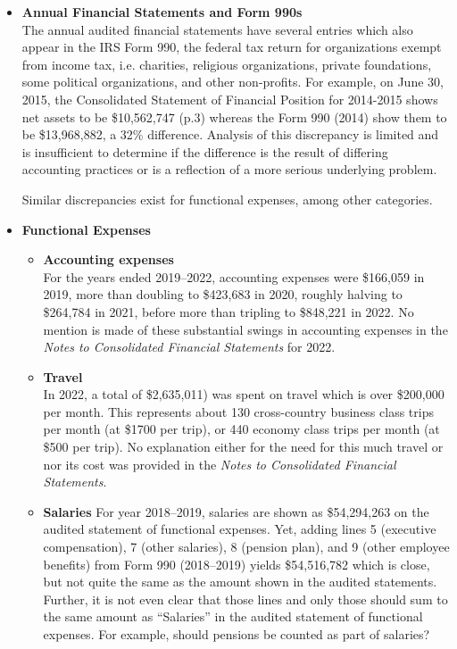 \begin{itemize}
  \item \textbf{Annual Financial Statements and Form 990s}\\
  The annual audited financial statements have several entries which also appear in the IRS Form 990, the federal tax return for organizations exempt from income tax, i.e. charities, religious organizations, private foundations, some political organizations, and other non-profits. For example, on June 30, 2015, the Consolidated Statement of Financial Position for 2014-2015 shows net assets to be \$10,562,747 (p.3) whereas the Form 990 (2014) show them to be \$13,968,882, a 32\% difference. Analysis of this discrepancy is limited and is insufficient to determine if the difference is the result of differing accounting practices or is a reflection of a more serious underlying problem.

  Similar discrepancies exist for functional expenses, among other categories.
  \item \textbf{Functional Expenses}\\
  \begin{itemize}
    \item \textbf{Accounting expenses}\\
    For the years ended 2019–2022, accounting expenses were \$166,059 in 2019, more than doubling to \$423,683 in 2020, roughly halving to \$264,784 in 2021, before more than tripling to \$848,221 in 2022. No mention is made of these substantial swings in accounting expenses in the \textit{Notes to Consolidated Financial Statements} for 2022.
    \item \textbf{Travel}\\
    In 2022, a total of \$2,635,011) was spent on travel which is over \$200,000 per month. This represents about 130 cross-country business class trips per month (at \$1700 per trip), or 440 economy class trips per month (at \$500 per trip). No explanation either for the need for this much travel or nor its cost was provided in the \textit{Notes to Consolidated Financial Statements}.
    \item \textbf{Salaries} For year 2018–2019, salaries are shown as \$54,294,263 on the audited statement of functional expenses. Yet, adding lines 5 (executive compensation), 7 (other salaries), 8 (pension plan), and 9 (other employee benefits) from Form 990 (2018–2019) yields \$54,516,782 which is close, but not quite the same as the amount shown in the audited statements. Further, it is not even clear that those lines and only those should sum to the same amount as ``Salaries'' in the audited statement of functional expenses.  For example, should pensions be counted as part of salaries? 
  \end{itemize}
\end{itemize}

